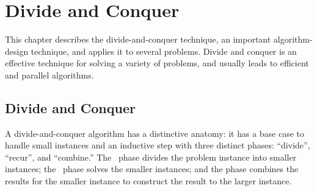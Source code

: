 \chapter{Divide and Conquer}
\label{ch:design::dc}

\begin{preamble}
This chapter describes the divide-and-conquer technique, an important algorithm-design technique, and applies it to several problems.
%
Divide and conquer is an effective technique for solving a variety of problems, and usually leads to efficient and parallel algorithms.
%
\end{preamble}

\section{Divide and Conquer}
\label{sec:design::dc}

\begin{gram}

A divide-and-conquer algorithm has a distinctive anatomy: it has a base case to handle small instances and an inductive step with three
distinct phases: ``divide'', ``recur'', and ``combine.''
%
The ~phase divides the problem instance into smaller instances;
%
the ~phase solves the smaller instances;
%
and the  phase combines the results for the smaller
instance to construct the result to the larger instance.
%
\end{gram}

